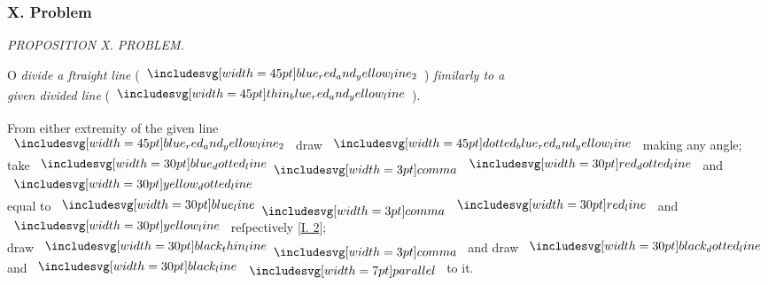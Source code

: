 \documentclass[12pt,preview]{standalone}
\begin{document}
\subsubsection{X. Problem}

\begin{minipage}[t]{0.33\textwidth}
    \vspace{40pt}
    
\end{minipage}%
\hfill
\begin{minipage}[t]{0.64\textwidth}
    \vspace{0pt}

    \begin{center}
        \textit{PROPOSITION X. PROBLEM.}\label{book6pr10} \\
    \end{center}

    \hfill

    \begin{center}
        \raggedright \lettrine[lines=4, loversize=1, nindent=0pt]{}{}O \textit{divide a ſtraight line} (\hspace{-1ex}$\bimg{blue_red_and_yellow_line_2}$\hspace{-1ex}) \textit{ſimilarly to a\\ given divided line} (\hspace{-1ex}$\bimg{thin_blue_red_and_yellow_line}$\hspace{-1ex}).
    \end{center}

    \hfill

    \hfill

    \hfill

    \begin{center}
        From either extremity of the given line\\
        $\bimg{blue_red_and_yellow_line_2}$ draw $\bimg{dotted_blue_red_and_yellow_line}$ making any angle;\\
        take $\dottedblueline \bcomma \dottedredline$ and $\dottedyellowline$\\
        equal to $\blueline \bcomma \redline$ and $\yellowline$ reſpectively [\hyperref[book1pr2]{\textsc{I.} 2}];\\
        draw $\blackthinline \bcomma$ and draw $\dottedblackline$ and $\blackline \bparallel$ to it.
    \end{center}

    \hfill


\end{minipage}
\end{document}
